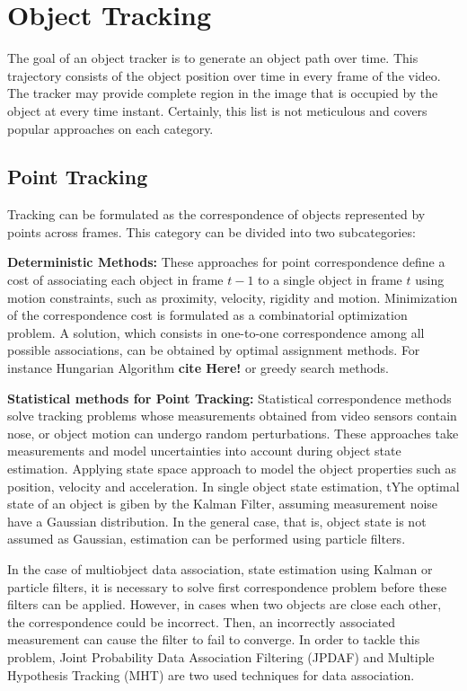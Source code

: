 \section{Object Tracking}

The goal of an object tracker is to generate an object path over time. This trajectory consists of the object position over time in every frame of the video. The tracker may provide complete region in the image that is occupied by the object at every time instant. Certainly, this list is not meticulous and covers popular approaches on each category.

\subsection{Point Tracking}

Tracking can be formulated as the correspondence of objects represented by points across frames. This category can be divided into two subcategories:

\textbf{Deterministic Methods: } These approaches for point correspondence define a cost of associating each object in frame $t-1$ to a single object in frame $t$ using motion constraints, such as proximity, velocity, rigidity and motion. Minimization of the correspondence cost is formulated as a combinatorial optimization problem. A solution, which consists in one-to-one correspondence among all possible associations, can be obtained by optimal assignment methods. For instance Hungarian Algorithm \textbf{cite Here!} or greedy search methods.

\textbf{Statistical methods for Point Tracking: } Statistical correspondence methods solve tracking problems whose measurements obtained from video sensors contain nose, or object motion can undergo random perturbations. These approaches take measurements and model uncertainties into account during object state estimation. Applying state space approach to model the object properties such as position, velocity and acceleration. In single object state estimation, tYhe optimal state of an object is giben by the Kalman Filter, assuming measurement noise have a Gaussian distribution. In the general case, that is, object state is not assumed as Gaussian, estimation can be performed using particle filters.

In the case of multiobject data association, state estimation using Kalman or particle filters, it is necessary to solve first correspondence problem before these filters can be applied. However, in cases when two objects are close each other, the correspondence could be incorrect. Then, an incorrectly associated measurement can cause the filter to fail to converge. In order to tackle this problem, Joint Probability Data Association Filtering (JPDAF) and Multiple Hypothesis Tracking (MHT) are two used techniques for data association.


